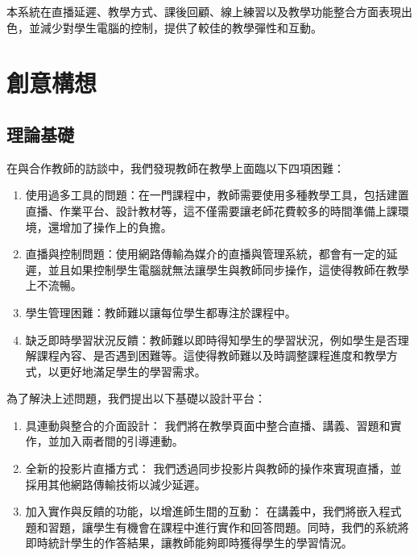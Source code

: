 \documentclass[12pt]{article}
\begin{document}
本系統在直播延遲、教學方式、課後回顧、線上練習以及教學功能整合方面表現出色，並減少對學生電腦的控制，提供了較佳的教學彈性和互動。


\section{創意構想}
\subsection{理論基礎}
在與合作教師的訪談中，我們發現教師在教學上面臨以下四項困難：
\begin{enumerate}[label=(\arabic*)]
  \item 使用過多工具的問題：在一門課程中，教師需要使用多種教學工具，包括建置直播、作業平台、設計教材等，這不僅需要讓老師花費較多的時間準備上課環境，還增加了操作上的負擔。
  \item 直播與控制問題：使用網路傳輸為媒介的直播與管理系統，都會有一定的延遲，並且如果控制學生電腦就無法讓學生與教師同步操作，這使得教師在教學上不流暢。
  \item 學生管理困難：教師難以讓每位學生都專注於課程中。
  \item 缺乏即時學習狀況反饋：教師難以即時得知學生的學習狀況，例如學生是否理解課程內容、是否遇到困難等。這使得教師難以及時調整課程進度和教學方式，以更好地滿足學生的學習需求。
\end{enumerate}
為了解決上述問題，我們提出以下基礎以設計平台：
\begin{enumerate}[label=(\arabic*)]
  \item 具連動與整合的介面設計：
  我們將在教學頁面中整合直播、講義、習題和實作，並加入兩者間的引導連動。
  \item 全新的投影片直播方式：
  我們透過同步投影片與教師的操作來實現直播，並採用其他網路傳輸技術以減少延遲。
  \item 加入實作與反饋的功能，以增進師生間的互動：
  在講義中，我們將嵌入程式題和習題，讓學生有機會在課程中進行實作和回答問題。同時，我們的系統將即時統計學生的作答結果，讓教師能夠即時獲得學生的學習情況。
\end{enumerate}
\end{document}
